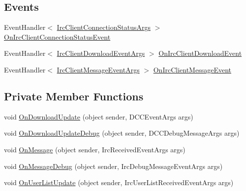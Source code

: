 \subsection*{Events}
\begin{DoxyCompactItemize}
\item 
Event\+Handler$<$ \mbox{\hyperlink{class_little_weeb_library_1_1_event_arguments_1_1_irc_client_connection_status_args}{Irc\+Client\+Connection\+Status\+Args}} $>$ \mbox{\hyperlink{class_little_weeb_library_1_1_handlers_1_1_irc_client_handler_aa8ef070963f103cc627e781c39b90c64}{On\+Irc\+Client\+Connection\+Status\+Event}}
\item 
Event\+Handler$<$ \mbox{\hyperlink{class_little_weeb_library_1_1_event_arguments_1_1_irc_client_download_event_args}{Irc\+Client\+Download\+Event\+Args}} $>$ \mbox{\hyperlink{class_little_weeb_library_1_1_handlers_1_1_irc_client_handler_a43ee49f8e97d65bf318e5f663587d7a6}{On\+Irc\+Client\+Download\+Event}}
\item 
Event\+Handler$<$ \mbox{\hyperlink{class_little_weeb_library_1_1_event_arguments_1_1_irc_client_message_event_args}{Irc\+Client\+Message\+Event\+Args}} $>$ \mbox{\hyperlink{class_little_weeb_library_1_1_handlers_1_1_irc_client_handler_a60906730beb3dae974b2bdc77a51bb8d}{On\+Irc\+Client\+Message\+Event}}
\end{DoxyCompactItemize}
\subsection*{Private Member Functions}
\begin{DoxyCompactItemize}
\item 
void \mbox{\hyperlink{class_little_weeb_library_1_1_handlers_1_1_irc_client_handler_afef5cc2f76989366cb52ffa7d5a78752}{On\+Download\+Update}} (object sender, D\+C\+C\+Event\+Args args)
\item 
void \mbox{\hyperlink{class_little_weeb_library_1_1_handlers_1_1_irc_client_handler_abdc8785a2452e7a1d496c44a424d1812}{On\+Download\+Update\+Debug}} (object sender, D\+C\+C\+Debug\+Message\+Args args)
\item 
void \mbox{\hyperlink{class_little_weeb_library_1_1_handlers_1_1_irc_client_handler_ad97947bcce5bebd851bef6e29fecb467}{On\+Message}} (object sender, Irc\+Received\+Event\+Args args)
\item 
void \mbox{\hyperlink{class_little_weeb_library_1_1_handlers_1_1_irc_client_handler_a2b48c617972be0b3079a262ffc8141f6}{On\+Message\+Debug}} (object sender, Irc\+Debug\+Message\+Event\+Args args)
\item 
void \mbox{\hyperlink{class_little_weeb_library_1_1_handlers_1_1_irc_client_handler_a8ffa9ba31b96d32a4c1fdafc04afaf5e}{On\+User\+List\+Update}} (object sender, Irc\+User\+List\+Received\+Event\+Args args)
\end{DoxyCompactItemize}
